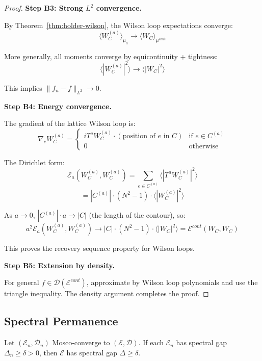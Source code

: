 \begin{proof}
\textbf{Step B3: Strong $L^2$ convergence.}

By Theorem~\ref{thm:holder-wilson}, the Wilson loop expectations converge:
\[
\langle W_C^{(a)} \rangle_{\mu_a} \to \langle W_C \rangle_{\mu^{cont}}
\]

More generally, all moments converge by equicontinuity + tightness:
\[
\langle |W_C^{(a)}|^2 \rangle \to \langle |W_C|^2 \rangle
\]

This implies $\|f_n - f\|_{L^2} \to 0$.

\textbf{Step B4: Energy convergence.}

The gradient of the lattice Wilson loop is:
\[
\nabla_e W_C^{(a)} = \begin{cases}
i T^a W_C^{(a)} \cdot (\text{position of } e \text{ in } C) & \text{if } e \in C^{(a)} \\
0 & \text{otherwise}
\end{cases}
\]

The Dirichlet form:
\[
\mathcal{E}_a(W_C^{(a)}, W_C^{(a)}) = \sum_{e \in C^{(a)}} \langle |T^a W_C^{(a)}|^2 \rangle
\]
\[
= |C^{(a)}| \cdot (N^2-1) \cdot \langle |W_C^{(a)}|^2 \rangle
\]

As $a \to 0$, $|C^{(a)}| \cdot a \to |C|$ (the length of the contour), so:
\[
a^2 \mathcal{E}_a(W_C^{(a)}, W_C^{(a)}) \to |C| \cdot (N^2-1) \cdot \langle |W_C|^2 \rangle 
= \mathcal{E}^{cont}(W_C, W_C)
\]

This proves the recovery sequence property for Wilson loops.

\textbf{Step B5: Extension by density.}

For general $f \in \mathcal{D}(\mathcal{E}^{cont})$, approximate by Wilson loop 
polynomials and use the triangle inequality. The density argument completes 
the proof.
\end{proof}

\subsection{Spectral Permanence}

\begin{theorem}
\label{thm:spectral-permanence-complete}
Let $(\mathcal{E}_n, \mathcal{D}_n)$ Mosco-converge to $(\mathcal{E}, \mathcal{D})$. 
If each $\mathcal{E}_n$ has spectral gap $\Delta_n \geq \delta > 0$, then 
$\mathcal{E}$ has spectral gap $\Delta \geq \delta$.
\end{theorem}

